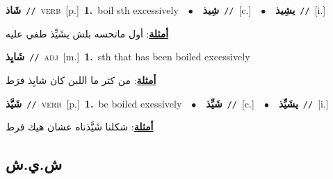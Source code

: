 \documentclass[10pt,a4paper,twoside]{article} %
\begin{document}
\begin{multicols}{2}
{\setlength\topsep{0pt}\textbf{\foreignlanguage{arabic}{شَاذ}}\ {\color{gray}\texttt{//}\color{black}}\ \textsc{verb}\ [p.]\ \textbf{1.}~boil sth excessively\ \ $\bullet$\ \ \setlength\topsep{0pt}\textbf{\foreignlanguage{arabic}{شِيذ}}\ {\color{gray}\texttt{//}\color{black}}\ [c.]\ \ $\bullet$\ \ \setlength\topsep{0pt}\textbf{\foreignlanguage{arabic}{يشِيذ}}\ {\color{gray}\texttt{//}\color{black}}\ [i.]\  \begin{flushright}\color{gray}\foreignlanguage{arabic}{\textbf{\underline{\foreignlanguage{arabic}{أمثلة}}}: أول ماتحسه بلش يشَيِّذ طفي عليه}\end{flushright}\color{black}} \vspace{2mm}

{\setlength\topsep{0pt}\textbf{\foreignlanguage{arabic}{شَايِذ}}\ {\color{gray}\texttt{//}\color{black}}\ \textsc{adj}\ [m.]\ \textbf{1.}~sth that has been boiled excessively\  \begin{flushright}\color{gray}\foreignlanguage{arabic}{\textbf{\underline{\foreignlanguage{arabic}{أمثلة}}}: من كثر ما اللبن كان شايِذ فرَط}\end{flushright}\color{black}} \vspace{2mm}

{\setlength\topsep{0pt}\textbf{\foreignlanguage{arabic}{شَيَّذ}}\ {\color{gray}\texttt{//}\color{black}}\ \textsc{verb}\ [p.]\ \textbf{1.}~be boiled exessively\ \ $\bullet$\ \ \setlength\topsep{0pt}\textbf{\foreignlanguage{arabic}{شَيِّذ}}\ {\color{gray}\texttt{//}\color{black}}\ [c.]\ \ $\bullet$\ \ \setlength\topsep{0pt}\textbf{\foreignlanguage{arabic}{يشَيِّذ}}\ {\color{gray}\texttt{//}\color{black}}\ [i.]\  \begin{flushright}\color{gray}\foreignlanguage{arabic}{\textbf{\underline{\foreignlanguage{arabic}{أمثلة}}}: شكلنا شَيَّذناه عشان هيك فرط}\end{flushright}\color{black}} \vspace{2mm}

\vspace{-3mm}
\subsection*{\color{blue}\foreignlanguage{arabic}{ش.ي.ش}\color{blue}{}} 


\end{multicols}
\end{document}
